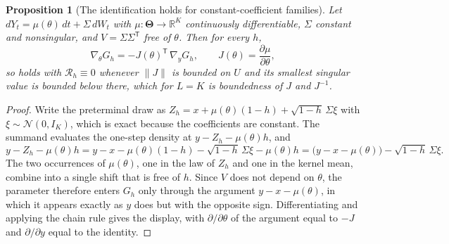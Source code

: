 \documentclass[11pt]{article}
\newtheorem{proposition}[proposition]{Proposition}
\theoremstyle{definition}
\newcommand{\R}{\mathbb{R}}
\newcommand{\Rem}{\mathcal{R}}
\newcommand{\Normal}{\mathcal{N}}
\newcommand{\ThetaSet}{\boldsymbol{\Theta}}
\begin{document}
\begin{proposition}[The identification holds for constant-coefficient families]\label{prop:score_identification_holds}
Let $dY_t=\mu(\theta)\,dt+\Sigma\,dW_t$ with $\mu:\ThetaSet\to\R^K$ continuously differentiable, $\Sigma$ constant and nonsingular, and $V=\Sigma\Sigma^{\mathsf T}$ free of $\theta$. Then for every $h$,
\[
\nabla_\theta G_h=-J(\theta)^{\mathsf T}\,\nabla_yG_h,
\qquad J(\theta)=\frac{\partial\mu}{\partial\theta},
\]
so  holds with $\Rem_h\equiv0$ whenever $\lVert J\rVert$ is bounded on $U$ and its smallest singular value is bounded below there, which for $L=K$ is boundedness of $J$ and $J^{-1}$.
\end{proposition}

\begin{proof}
Write the preterminal draw as $Z_h=x+\mu(\theta)(1-h)+\sqrt{1-h}\,\Sigma\xi$ with $\xi\sim\Normal(0,I_K)$, which is exact because the coefficients are constant. The summand evaluates the one-step density at $y-Z_h-\mu(\theta)h$, and
\[
y-Z_h-\mu(\theta)h
=y-x-\mu(\theta)(1-h)-\sqrt{1-h}\,\Sigma\xi-\mu(\theta)h
=\bigl(y-x-\mu(\theta)\bigr)-\sqrt{1-h}\,\Sigma\xi .
\]
The two occurrences of $\mu(\theta)$, one in the law of $Z_h$ and one in the kernel mean, combine into a single shift that is free of $h$. Since $V$ does not depend on $\theta$, the parameter therefore enters $G_h$ only through the argument $y-x-\mu(\theta)$, in which it appears exactly as $y$ does but with the opposite sign. Differentiating and applying the chain rule gives the display, with $\partial/\partial\theta$ of the argument equal to $-J$ and $\partial/\partial y$ equal to the identity.
\end{proof}
\end{document}
